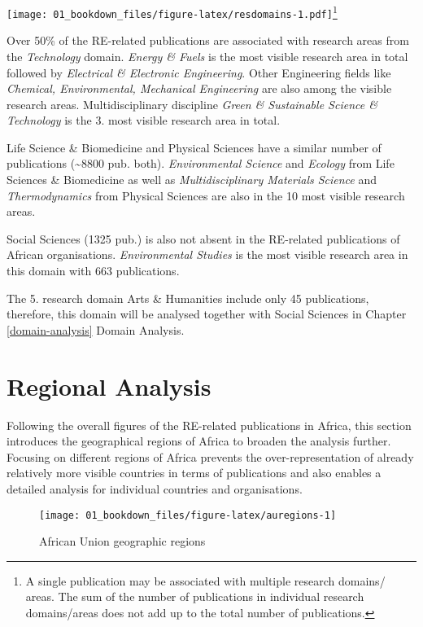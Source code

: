 \documentclass[12pt,twoside]{report}
\let\rmarkdownfootnote\footnote%
\def\footnote{\protect\rmarkdownfootnote}
\begin{document}
\texttt{[image: 01\_bookdown\_files/figure-latex/resdomains-1.pdf]}\footnote{A single publication may be associated with multiple research domains/ areas. The sum of the number of publications in individual research domains/areas does not add up to the total number of publications.}

Over 50\% of the RE-related publications are associated with research areas from the \emph{Technology} domain. \emph{Energy \& Fuels} is the most visible research area in total followed by \emph{Electrical \& Electronic Engineering}. Other Engineering fields like \emph{Chemical, Environmental, Mechanical Engineering} are also among the visible research areas. Multidisciplinary discipline \emph{Green \& Sustainable Science \& Technology} is the 3. most visible research area in total.

Life Science \& Biomedicine and Physical Sciences have a similar number of publications (\textasciitilde8800 pub. both). \emph{Environmental Science} and \emph{Ecology} from Life Sciences \& Biomedicine as well as \emph{Multidisciplinary Materials Science} and \emph{Thermodynamics} from Physical Sciences are also in the 10 most visible research areas.

Social Sciences (1325 pub.) is also not absent in the RE-related publications of African organisations. \emph{Environmental Studies} is the most visible research area in this domain with 663 publications.

The 5. research domain Arts \& Humanities include only 45 publications, therefore, this domain will be analysed together with Social Sciences in Chapter \ref{domain-analysis} Domain Analysis.

\hypertarget{regional-analysis}{%
\section{Regional Analysis}\label{regional-analysis}}

Following the overall figures of the RE-related publications in Africa, this section introduces the geographical regions of Africa to broaden the analysis further. Focusing on different regions of Africa prevents the over-representation of already relatively more visible countries in terms of publications and also enables a detailed analysis for individual countries and organisations.

\begin{figure}
\texttt{[image: 01\_bookdown\_files/figure-latex/auregions-1]} \caption{African Union geographic regions}\label{fig:auregions}
\end{figure}
\end{document}
